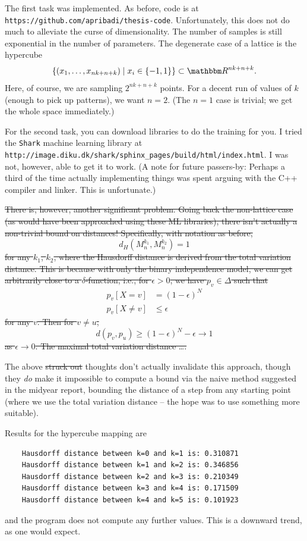 \documentclass[12pt]{article}
\begin{document}
The first task was implemented.  As before, code is at
\mbox{\texttt{https://github.com/apribadi/thesis-code}}.  Unfortunately, this
does not do much to alleviate the curse of dimensionality.  The number of
samples is still exponential in the number of parameters.  The degenerate case
of a lattice is the hypercube
\[
    \{ (x_1, \ldots, x_{nk+n+k}) \mid x_i \in \{-1, 1\}\} \subset \R^{nk+n+k}.
\]
Here, of course, we are sampling $2^{nk+n+k}$ points.  For a decent run of
values of $k$ (enough to pick up patterns), we want $n=2$.  (The $n=1$ case is
trivial; we get the whole space immediately.)

For the second task, you can download libraries to do the training for you.  I
tried the \texttt{Shark} machine learning library at
\mbox{\texttt{http://image.diku.dk/shark/sphinx\_pages/build/html/index.html}}.
I was not, however, able to get it to work.  (A note for future passers-by:
Perhaps a third of the time actually implementing things was spent arguing with
the C++ compiler and linker.  This is unfortunate.)

\sout{
There is, however, another significant problem.  Going back the non-lattice case
(as would have been approached using these ML libraries), there isn't actually a
non-trivial bound on distances!  Specifically, with notation as before,}
\[
    d_H(M_n^{k_1}, M_n^{k_2}) = 1
\]\sout{
for any $k_1$, $k_2$, where the Hausdorff distance is derived from the total
variation distance.  This is because with only the binary independence model, we
can get arbitrarily close to a $\delta$-function, i.e., for $\epsilon > 0$, we
have $p_v \in \Delta$ such that}
\begin{align*}
    p_v[X = v] &= (1 - \epsilon)^N \\
    p_v[X \ne v] &\le \epsilon
\end{align*}
\sout{ for any $v$.  Then for $v \ne u$,}
\[
    d(p_v, p_u) \ge (1 - \epsilon)^N - \epsilon \to 1
\]
\sout{
as $\epsilon \to 0$.  The maximal total variation distance \ldots.}

The above \sout{struck out} thoughts don't actually invalidate this approach,
though they \emph{do} make it impossible to compute a bound via the naive
method suggested in the midyear report, bounding the distance of a step from any
starting point (where we use the total variation distance -- the hope was to use
something more suitable).

Results for the hypercube mapping are
\begin{verbatim}
    Hausdorff distance between k=0 and k=1 is: 0.310871
    Hausdorff distance between k=1 and k=2 is: 0.346856
    Hausdorff distance between k=2 and k=3 is: 0.210349
    Hausdorff distance between k=3 and k=4 is: 0.171509
    Hausdorff distance between k=4 and k=5 is: 0.101923
\end{verbatim}
and the program does not compute any further values.  This is a downward trend,
as one would expect.
    
\end{document}
